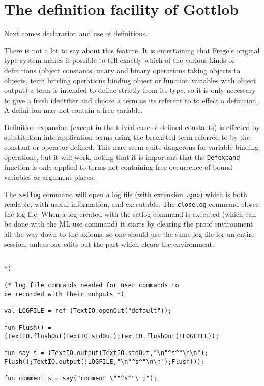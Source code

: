 \documentclass{article}
\begin{document}
{{\newpage

\section{The definition facility of Gottlob}

Next comes declaration and use of definitions.

There is not a lot to say about this feature.  It is entertaining that Frege's original type system makes it possible to tell exactly which of the various kinds of definitions
(object constants, unary and binary operations taking objects to objects, term binding operations binding object or function variables with object output) a term is intended
to define strictly from its type, so it is only necessary to give a fresh identifier and choose a term as its referent to to effect a definition.  A definition may not contain a free variable.

Definition expansion  (except in the trivial case of defined constants)  is effected by substitution into application terms using the bracketed term referred to by  the constant or operator defined.  This may seem quite dangerous for variable binding operations, but it will work, noting that it is important that the {\tt Defexpand\/} function is only applied to terms not containing free occurrence of bound variables or argument places.

The {\tt setlog} command will open a log file (with extension {\tt .gob}) which is both readable, with useful information, and executable.  The {\tt closelog} command closes the log file.  When a log created with the setlog command is executed (which can be done with the ML use command) it starts by clearing the proof environment all the way down to the axioms, so one should use the same log file for an entire session, unless one edits out the part which clears the environment.

\begin{verbatim}

*)

(* log file commands needed for user commands to
be recorded with their outputs *)

val LOGFILE = ref (TextIO.openOut("default"));

fun Flush() = (TextIO.flushOut(TextIO.stdOut);TextIO.flushOut(!LOGFILE));

fun say s = (TextIO.output(TextIO.stdOut,"\n"^s^"\n\n");
Flush();TextIO.output(!LOGFILE,"\n"^s^"\n\n");Flush());

fun comment s = say("comment \""^s^"\";");


\end{verbatim}}}
\end{document}
